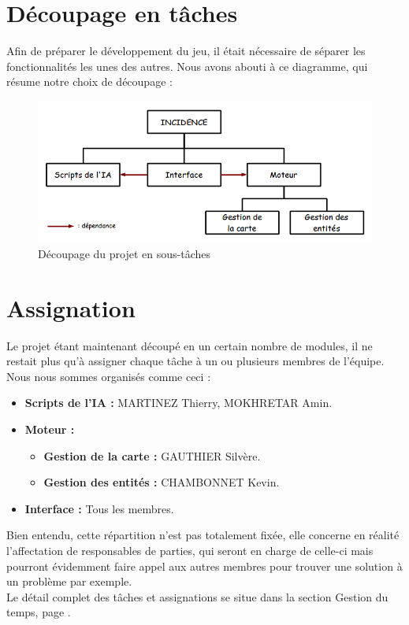 \documentclass[a4paper]{article}
\newcommand{\alinea}{\hspace*{0.5cm}}
\begin{document}
    \section{Découpage en tâches}
      \alinea Afin de préparer le développement du jeu, il était nécessaire de séparer les fonctionnalités les unes des autres. Nous avons abouti à ce diagramme, qui résume notre choix de découpage :
      \begin{figure}
        \begin{center}
          \includegraphics[scale=0.5]{img/DiagrammeDecoupageProjet.png}
        \end{center}
        \label{DiagDecoupage}
        \caption{Découpage du projet en sous-tâches}
      \end{figure}

    \section{Assignation}
      \alinea Le projet étant maintenant découpé en un certain nombre de modules, il ne restait plus qu'à assigner chaque tâche à un ou plusieurs membres de l'équipe. Nous nous sommes organisés comme ceci :
      \begin{itemize}
        \item \textbf{Scripts de l'IA :} MARTINEZ Thierry, MOKHRETAR Amin.
        \item \textbf{Moteur :}
        \begin{itemize}
          \item \textbf{Gestion de la carte :} GAUTHIER Silvère.
          \item \textbf{Gestion des entités :} CHAMBONNET Kevin.
        \end{itemize}
        \item \textbf{Interface :} Tous les membres.
      \end{itemize}
      \alinea Bien entendu, cette répartition n'est pas totalement fixée, elle concerne en réalité l'affectation de responsables de parties, qui seront en charge de celle-ci mais pourront évidemment faire appel aux autres membres pour trouver une solution à un problème par exemple.\\
      \alinea Le détail complet des tâches et assignations se situe dans la section Gestion du temps, page \pageref{GestionTps}.
\end{document}
